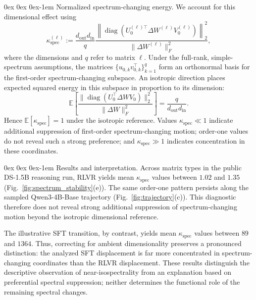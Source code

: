 \documentclass[11pt, a4paper]{utda}
\makeatletter
\renewcommand{\paragraph}{%
  \@startsection{paragraph}{4}%
  {\z@}{0ex \@plus 0ex \@minus 0ex}{-1em}%
  {\normalfont\normalsize\bfseries}%
}
\theoremstyle{plain}
\theoremstyle{definition}
\theoremstyle{remark}
\makeatother
\begin{document}
\paragraph{Normalized spectrum-changing energy.}
We account for this dimensional effect using
\begin{equation}
\label{eq:kappa_spec}
    \kappa_{\mathrm{spec}}^{(\ell)}
    :=
    \frac{d_{\mathrm{out}}d_{\mathrm{in}}}{q}
    \frac{
        \left\|
            \operatorname{diag}
            \left(
                U_0^{(\ell)\top}
                \Delta W^{(\ell)}
                V_0^{(\ell)}
            \right)
        \right\|_2^2
    }{
        \|\Delta W^{(\ell)}\|_F^2
    },
\end{equation}
where the dimensions and $q$ refer to matrix $\ell$.
Under the full-rank, simple-spectrum assumptions, the matrices
$\{u_{0,k}v_{0,k}^\top\}_{k=1}^q$ form an orthonormal basis
for the first-order spectrum-changing subspace.
An isotropic direction places expected squared energy in this
subspace in proportion to its dimension:
\begin{equation}
\label{eq:isotropic_spectrum_fraction}
    \mathbb{E}\left[
        \frac{
            \|\operatorname{diag}(U_0^\top\Delta W V_0)\|_2^2
        }{
            \|\Delta W\|_F^2
        }
    \right]
    =
    \frac{q}{d_{\mathrm{out}}d_{\mathrm{in}}}.
\end{equation}
Hence $\mathbb{E}[\kappa_{\mathrm{spec}}]=1$ under the
isotropic reference.
Values $\kappa_{\mathrm{spec}}\ll1$ indicate additional
suppression of first-order spectrum-changing motion;
order-one values do not reveal such a strong preference;
and $\kappa_{\mathrm{spec}}\gg1$ indicates concentration
in these coordinates.

\paragraph{Results and interpretation.}
Across matrix types in the public DS-1.5B reasoning run,
RLVR yields mean $\kappa_{\mathrm{spec}}$ values between
$1.02$ and $1.35$
(Fig.~\ref{fig:spectrum_stability}(e)).
The same order-one pattern persists along the sampled
Qwen3-4B-Base trajectory
(Fig.~\ref{fig:trajectory}(c)).
This diagnostic therefore does not reveal strong additional
suppression of spectrum-changing motion beyond the
isotropic dimensional reference.

The illustrative SFT transition, by contrast, yields mean
$\kappa_{\mathrm{spec}}$ values between $89$ and $1364$.
Thus, correcting for ambient dimensionality preserves a
pronounced distinction: the analyzed SFT displacement is
far more concentrated in spectrum-changing coordinates
than the RLVR displacement.
These results distinguish the descriptive observation of
near-isospectrality from an explanation based on preferential
spectral suppression; neither determines the functional role
of the remaining spectral changes.
\end{document}
